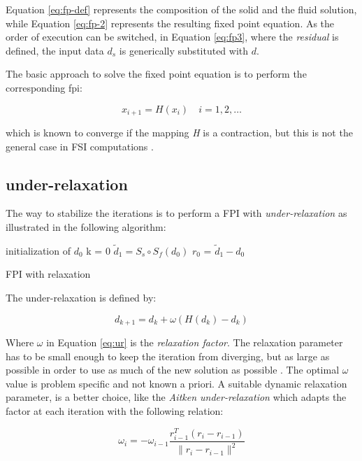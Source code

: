 Equation \ref{eq:fp-def} represents the composition of the solid and the fluid solution, while Equation \ref{eq:fp-2} represents the resulting fixed point equation. As the order of execution can be switched, in Equation \ref{eq:fp3}, where the \textit{residual} is defined, the input data $d_s$ is generically substituted with $d$.

The basic approach to solve the fixed point equation is to perform the corresponding \acrfull{fpi}:

\begin{equation}
	x_{i+1} = H(x_i) \quad i=1,2,\ldots
\end{equation} 

which is known to converge if the mapping \textit{H} is a contraction, but this is not the general case in FSI computations \cite{mehl2016parallel}. 

\subsection{under-relaxation}

The way to stabilize the iterations is to perform a FPI with \textit{under-relaxation} as illustrated in the following algorithm:

\begin{algorithm}[H]
	\SetAlgoLined
	initialization of $d_0$\;
	k = 0\;
	$\tilde{d}_1 = S_s \circ S_f(d_0)$\;
	$r_0$ = $\tilde{d}_1 - d_0$\;
	\caption{FPI with relaxation}
\end{algorithm}

The under-relaxation is defined by:

\begin{equation}
	d_{k+1} = d_{k} + \omega \left( H(d_k)  - d_k  \right)
	\label{eq:ur}
\end{equation} 

Where $\omega$ in Equation \ref{eq:ur} is the \textit{relaxation factor}. The relaxation parameter has to be small enough to keep the iteration from diverging, but as large as possible in order to use as much of the new solution as possible \cite{kuttler2008fixed}. The optimal $\omega$ value is problem specific and not known a priori.
A suitable dynamic relaxation parameter, is a better choice, like the \textit{Aitken under-relaxation} \cite{irons1969version} which adapts the factor at each iteration with the following relation:

\begin{equation}
	\omega_i = -\omega_{i-1} \frac{r_{i-1}^T \left(r_i - r_{i-1}\right)}{ \lVert r_i - r_{i-1} \rVert ^2}
\end{equation}

